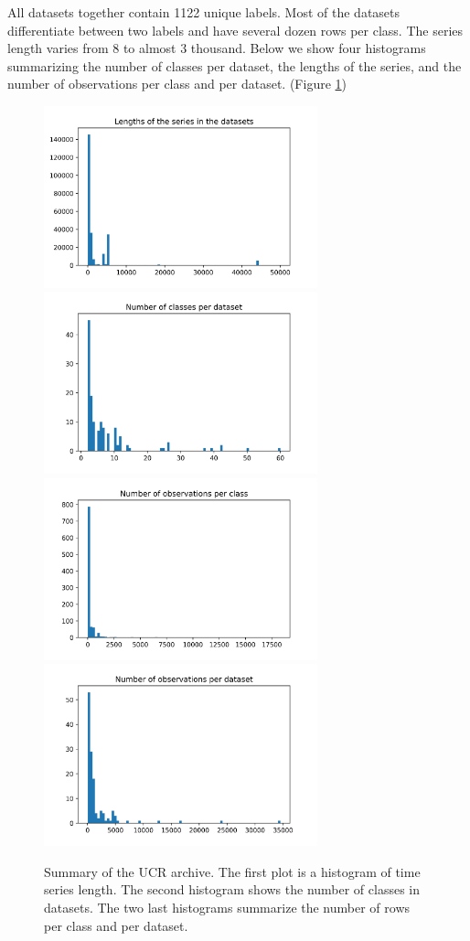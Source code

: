 \documentclass[a4paper,11pt,twoside]{report}
\theoremstyle{definition}
\begin{document}
All datasets together contain 1122 unique labels. Most of the datasets differentiate between two labels and have several dozen rows per class. The series length varies from 8 to almost 3 thousand. Below we show four histograms summarizing the number of classes per dataset, the lengths of the series, and the number of observations per class and per dataset. (Figure \ref{fig:histograms})
\begin{figure}[h!]
\centering
\includegraphics[width=7.9cm]{imgs/lengths_of_the_series_in_the_datasets.png}
\includegraphics[width=7.9cm]{imgs/number_of_classes_per_dataset.png}
\includegraphics[width=7.9cm]{imgs/number_of_observations_per_class.png}
\includegraphics[width=7.9cm]{imgs/number_of_observations_per_dataset.png}
\caption{Summary of the UCR archive. The first plot is a histogram of time series length. The second histogram shows the number of classes in datasets. The two last histograms summarize the number of rows per class and per dataset.}
\label{fig:histograms}
\end{figure}
\end{document}
